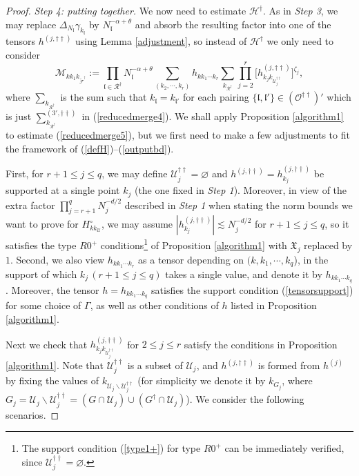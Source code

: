 \documentclass[11 pt,reqno]{amsart}
\theoremstyle{definition}
\theoremstyle{remark}
\numberwithin{equation}{section}
\newcommand{\Fc}{\mathcal{F}}
\newcommand{\Rc}{\mathcal{R}}
\newcommand{\Uc}{\mathcal{U}}
\renewcommand{\Mc}{\mathcal{M}}
\newcommand{\Hc}{\mathcal{H}}
\newcommand{\Xf}{\mathfrak{X}}
\newcommand{\lf}{\mathfrak{l}}
\newcommand{\Os}{\mathscr{O}}
\begin{document}
{\begin{proof}
\emph{Step 4: putting together.} We now need to estimate $\Hc^\dagger$. As in \emph{Step 3}, we may replace $\Delta_{N_\lf}\gamma_{k_\lf}$ by $N_\lf^{-\alpha+\theta}$ and absorb the resulting factor into one of the tensors $h^{(j,\dagger\dagger)}$ using Lemma \ref{adjustment}, so instead of $\Hc^\dagger$ we only need to consider
\begin{equation}\label{reducedmerge5}\Mc_{kk_1k_{\widetilde{\Fc}^\dagger}}:=\prod_{\lf\in\Rc^\dagger}N_\lf^{-\alpha+\theta}\sum_{(k_2,\cdots,k_r)}h_{kk_1\cdots k_r}\sum_{k_{\Rc^\dagger}}\prod_{j=2}^{r}\big[h_{k_jk_{\Uc_j^{\dagger\dagger}}}^{(j,\dagger\dagger)}\big]^{\zeta_j},
\end{equation} where $\sum_{k_{\Rc^\dagger}}$ is the sum such that $k_\lf=k_{\lf'}$ for each pairing $\{\lf,\lf'\}\in (\Os^{\dagger\dagger})'$  which is just $\sum_{k_{\Rc^\dagger}}^{(3',\dagger\dagger)}$ in (\ref{reducedmerge4}). We shall apply Proposition \ref{algorithm1} to estimate (\ref{reducedmerge5}), but we first need to make a few adjustments to fit the framework of (\ref{defH})--(\ref{outputbd}).

First, for $r+1\leq j\leq q$, we may define $\Uc_j^{\dagger\dagger}=\varnothing$ and $h^{(j,\dagger\dagger)}=h_{k_j}^{(j,\dagger\dagger)}$ be supported at a single point $k_j$ (the one fixed in \emph{Step 1}).  Moreover, in view of the extra factor  $\prod_{j=r+1}^q N_j^{-d/2}$ described in \emph{Step 1} when stating the norm bounds we want to prove for $H_{kk_\Uc}^\circ$, we may assume $|h_{k_j}^{(j,\dagger\dagger)}|\lesssim N_j^{-d/2}$ for $r+1\leq j\leq q$, so it satisfies the type $R0^+$ conditions\footnote{The support condition (\ref{type1+}) for type $R0^+$ can be immediately verified, since $\Uc_j^{\dagger\dagger} = \varnothing$.} of Proposition \ref{algorithm1} with $\Xf_j$ replaced by $1$.
Second, we also view $h_{kk_1\cdots k_r}$ as a tensor depending on $(k,k_1,\cdots,k_q$), in the support of which $k_j\,(r+1\leq j\leq q)$ takes a single value, and denote it by $h_{kk_1\cdots k_q}$. Moreover, the tensor $h=h_{kk_1\cdots k_q}$ satisfies the support condition (\ref{tensorsupport}) for some choice of $\Gamma$, as well as other conditions of $h$ listed in Proposition \ref{algorithm1}. 

Next we check that $h_{k_jk_{\Uc_j^{\dagger\dagger}}}^{(j,\dagger\dagger)}$ for $2\leq j\leq r$ satisfy the conditions in Proposition \ref{algorithm1}.
Note that $\Uc_j^{\dagger\dagger}$ is a subset of $\Uc_j$, and $h^{(j,\dagger\dagger)}$ is formed from $h^{(j)}$ by fixing the values of $k_{\Uc_j\backslash\Uc_j^{\dagger\dagger}}$ (for simplicity we denote it by $k_{G_j}$, where $G_j = \Uc_j\backslash\Uc_j^{\dagger\dagger}= (G\cap \Uc_j)\cup (G^\dagger\cap \Uc_j)$). We consider the following scenarios.


\end{proof}}
\end{document}
